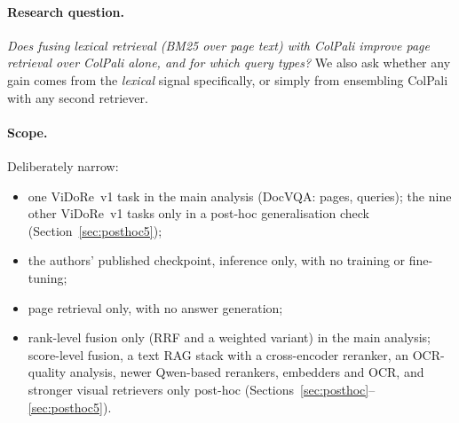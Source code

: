 \documentclass[11pt,a4paper]{article}
\begin{document}
\paragraph{Research question.}
\emph{Does fusing lexical retrieval (BM25 over page text) with ColPali improve page retrieval over ColPali alone, and for which query types?}
We also ask whether any gain comes from the \emph{lexical} signal specifically, or simply from ensembling ColPali with any second retriever.

\paragraph{Scope.}
Deliberately narrow:
\begin{itemize}
  \item one ViDoRe~v1 task in the main analysis (DocVQA: \nPages{} pages, \nQueries{} queries); the nine other ViDoRe~v1 tasks only in a post-hoc generalisation check (Section~\ref{sec:posthoc5});
  \item the authors' published checkpoint, inference only, with no training or fine-tuning;
  \item page retrieval only, with no answer generation;
  \item rank-level fusion only (RRF and a weighted variant) in the main analysis; score-level fusion, a text RAG stack with a cross-encoder reranker, an OCR-quality analysis, newer Qwen-based rerankers, embedders and OCR, and stronger visual retrievers only post-hoc (Sections~\ref{sec:posthoc}--\ref{sec:posthoc5}).
\end{itemize}
\end{document}
